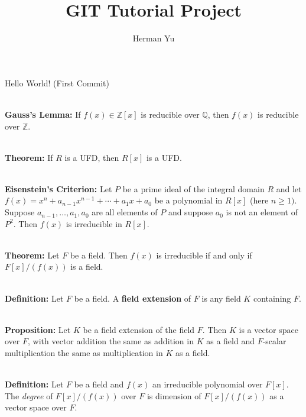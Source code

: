 \documentclass[12pt]{article}
\begin{document}
\title{GIT Tutorial Project}
\date{}
\author{Herman Yu}
\maketitle

Hello World! (First Commit)\par 
\hfill \\
\textbf{Gauss's Lemma:} If $f(x)\in \mathbb{Z}[x]$ is reducible over $\mathbb{Q}$, then $f(x)$ is reducible over $\mathbb{Z}$.\par 
\hfill \\
\textbf{Theorem:} If $R$ is a UFD, then $R[x]$ is a UFD.\par 
\hfill \\
\textbf{Eisenstein's Criterion:} Let $P$ be a prime ideal of the integral domain $R$ and let $f(x)=x^n+a_{n-1}x^{n-1}+\cdots + a_1x+a_0$ be a polynomial in $R[x]$ (here $n\geq 1)$. Suppose $a_{n-1},\dots, a_1,a_0$ are all elements of $P$ and suppose $a_0$ is not an element of $P^2$. Then $f(x)$ is irreducible in $R[x]$.\par 
\hfill \\
\textbf{Theorem:} Let $F$ be a field. Then $f(x)$ is irreducible if and only if $F[x]/(f(x))$ is a field.\par 
\hfill \\
\textbf{Definition:} Let $F$ be a field. A \textbf{field extension} of $F$ is any field $K$ containing $F$.\par 
\hfill \\
\textbf{Proposition:} Let $K$ be a field extension of the field $F$. Then $K$ is a vector space over $F$, with vector addition the same as addition in $K$ as a field and $F$-scalar multiplication the same as multiplication in $K$ as a field.\par 
\hfill \\
\textbf{Definition:} Let $F$ be a field and $f(x)$ an irreducible polynomial over $F[x]$. The \emph{degree} of $F[x]/(f(x))$ over $F$ is dimension of $F[x]/(f(x))$ as a vector space over $F$.\par 
\end{document}
